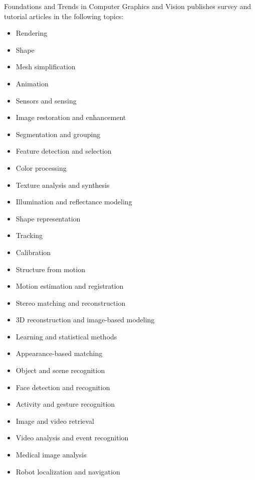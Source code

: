 


\journalaimsandscope
 {%
 Foundations and Trends\textsuperscript{\textregistered} in
Computer Graphics and Vision publishes
 survey and tutorial articles in the following topics:
 \begin{multicols}{2}\raggedcolumns
 \begin{itemize}
\item{Rendering}
\item{Shape}
\item{Mesh simplification}
\item{Animation}
\item{Sensors and sensing}
\item{Image restoration and enhancement}
\item{Segmentation and grouping}
\item{Feature detection and selection}
\item{Color processing}
\item{Texture analysis and synthesis}
\item{Illumination and reflectance modeling}
\item{Shape representation}
\item{Tracking}
\item{Calibration}
\item{Structure from motion}
\item{Motion estimation and registration}
\item{Stereo matching and reconstruction}
\item{3D reconstruction and image-based modeling}
\item{Learning and statistical methods}
\item{Appearance-based matching}
\item{Object and scene recognition}
\item{Face detection and recognition}
\item{Activity and gesture recognition}
\item{Image and video retrieval}
\item{Video analysis and event recognition}
\item{Medical image analysis}
\item{Robot localization and navigation}
\end{itemize}
 \end{multicols}
 }


